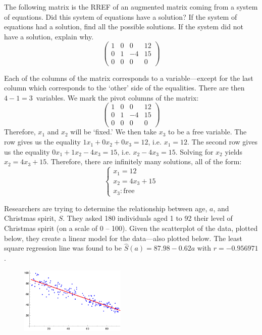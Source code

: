 \documentclass[12pt,letterpaper]{exam}
\begin{document}
\begin{questions}
\newpage
\question[10] The following matrix is the RREF of an augmented matrix coming from a system of equations. Did this system of equations have a solution? If the system of equations had a solution, find all the possible solutions. If the system did not have a solution, explain why. 
	\[
	\begin{pmatrix}
	1 & 0 & 0 & 12 \\
	0 & 1 & -4 & 15 \\
	0 & 0 & 0 & 0 
	\end{pmatrix}
	\] \pspace

\sol Each of the columns of the matrix corresponds to a variable---except for the last column which corresponds to the `other' side of the equalities. There are then $4 - 1= 3$~variables. We mark the pivot columns of the matrix: 
	\[
	\begin{pmatrix}
	\boxed{1} & 0 & 0 & 12 \\
	0 & \boxed{1} & -4 & 15 \\
	0 & 0 & 0 & 0 
	\end{pmatrix}
	\]
Therefore, $x_1$ and $x_2$ will be `fixed.' We then take $x_3$ to be a free variable. The row gives us the equality $1x_1 + 0x_2 + 0x_3= 12$, i.e. $x_1= 12$. The second row gives us the equality $0x_1 + 1x_2 - 4x_3= 15$, i.e. $x_2 - 4x_3= 15$. Solving for $x_2$ yields $x_2= 4x_3 + 15$. Therefore, there are infinitely many solutions, all of the form:
	\[
	\begin{cases}
	x_1= 12 \\
	x_2= 4x_3 + 15 \\
	x_3 \colon \text{free}
	\end{cases}
	\]



\newpage
\question[10] Researchers are trying to determine the relationship between age, $a$, and Christmas spirit, $S$. They asked 180 individuals aged 1 to 92 their level of Christmas spirit (on a scale of 0 -- 100). Given the scatterplot of the data, plotted below, they create a linear model for the data---also plotted below. The least square regression line was found to be $\widehat{S}(a)= 87.98 - 0.62a$ with $r= -0.956971$. \par
	\begin{figure}[h]
	\centering
	\includegraphics[width=0.45\textwidth]{xmas_spirit.png}
	\end{figure}


\end{questions}
\end{document}
